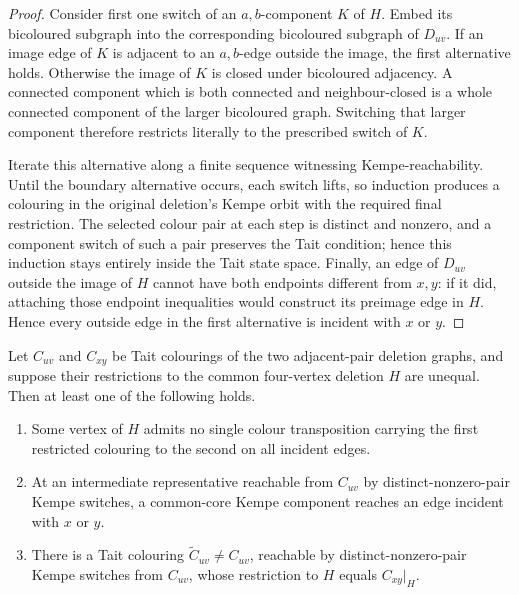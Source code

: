 \begin{proof}
Consider first one switch of an \(a,b\)-component \(K\) of \(H\).
Embed its bicoloured subgraph into the corresponding bicoloured subgraph of
\(D_{uv}\).  If an image edge of \(K\) is adjacent to an \(a,b\)-edge
outside the image, the first alternative holds.  Otherwise the image of
\(K\) is closed under bicoloured adjacency.  A connected component which is
both connected and neighbour-closed is a whole connected component of the
larger bicoloured graph.  Switching that larger component therefore
restricts literally to the prescribed switch of \(K\).

Iterate this alternative along a finite sequence witnessing
Kempe-reachability.  Until the boundary alternative occurs, each switch
lifts, so induction produces a colouring in the original deletion's Kempe
orbit with the required final restriction.  The selected colour pair at
each step is distinct and nonzero, and a component switch of such a pair
preserves the Tait condition; hence this induction stays entirely inside the
Tait state space.  Finally, an edge of \(D_{uv}\)
outside the image of \(H\) cannot have both endpoints different from
\(x,y\): if it did, attaching those endpoint inequalities would construct
its preimage edge in \(H\).  Hence every outside edge in the first
alternative is incident with \(x\) or \(y\).
\end{proof}

\begin{corollary}
\label{cor:common-core-disagreement-residue}
Let \(C_{uv}\) and \(C_{xy}\) be Tait colourings of the two adjacent-pair deletion graphs,
and suppose their restrictions to the common four-vertex deletion \(H\)
are unequal.  Then at least one of the following holds.
\begin{enumerate}
\item Some vertex of \(H\) admits no single colour transposition carrying
      the first restricted colouring to the second on all incident edges.
\item At an intermediate representative reachable from \(C_{uv}\) by
      distinct-nonzero-pair Kempe switches,
      a common-core Kempe component reaches an edge incident with \(x\) or
      \(y\).
\item There is a Tait colouring \(\widetilde C_{uv}\ne C_{uv}\), reachable
      by distinct-nonzero-pair Kempe switches from \(C_{uv}\), whose
      restriction to \(H\) equals
      \(C_{xy}|_H\).
\end{enumerate}
\end{corollary}

